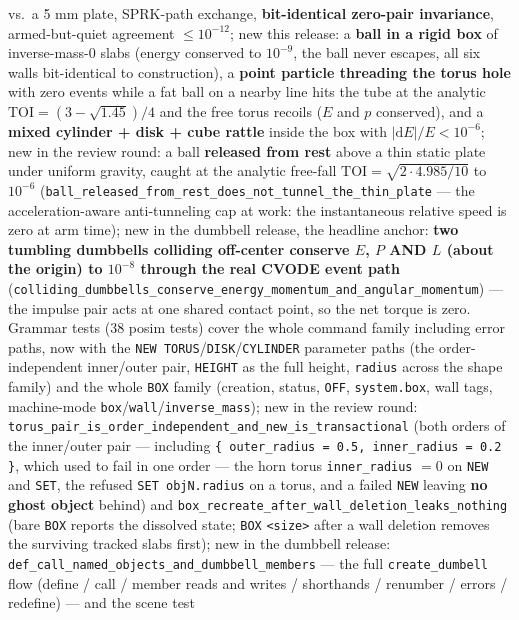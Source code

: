 \documentclass[11pt]{article}
\newcommand{\kw}[1]{\texttt{\uppercase{#1}}}
\newcommand{\code}[1]{\texttt{#1}}
\begin{document}
vs.\ a 5 mm plate, SPRK-path exchange, \textbf{bit-identical zero-pair
invariance}, armed-but-quiet agreement $\le 10^{-12}$; new this release: a
\textbf{ball in a rigid box} of inverse-mass-0 slabs (energy conserved to
$10^{-9}$, the ball never escapes, all six walls bit-identical to
construction), a \textbf{point particle threading the torus hole} with zero
events while a fat ball on a nearby line hits the tube at the analytic
$\mathrm{TOI} = (3 - \sqrt{1.45})/4$ and the free torus recoils ($E$ and $p$
conserved), and a \textbf{mixed cylinder + disk + cube rattle} inside the
box with $|\mathrm dE|/E < 10^{-6}$; new in the review round: a ball
\textbf{released from rest} above a thin static plate under uniform
gravity, caught at the analytic free-fall
$\mathrm{TOI} = \sqrt{2 \cdot 4.985/10}$ to $10^{-6}$
(\code{ball\_released\_from\_rest\_does\_not\_tunnel\_the\_thin\_plate}
--- the acceleration-aware anti-tunneling cap at work: the instantaneous
relative speed is zero at arm time); new in the dumbbell release, the
headline anchor: \textbf{two tumbling dumbbells colliding off-center
conserve $E$, $P$ AND $L$ (about the origin) to $10^{-8}$ through the real
CVODE event path}
(\code{colliding\_dumbbells\_conserve\_energy\_momentum\_and\_angular\_momentum})
--- the impulse pair acts at one shared contact point, so the net torque is
zero. Grammar tests (38 posim tests) cover
the whole command family including error paths, now with the
\kw{new torus}/\kw{disk}/\kw{cylinder} parameter paths (the
order-independent inner/outer pair, \kw{height} as the full height,
\code{radius} across the shape family) and the whole \kw{box} family
(creation, status, \kw{off}, \code{system.box}, wall tags, machine-mode
\code{box}/\code{wall}/\code{inverse\_mass}); new in the review round:
\code{torus\_pair\_is\_order\_independent\_and\_new\_is\_transactional}
(both orders of the inner/outer pair --- including
\code{\{ outer\_radius = 0.5, inner\_radius = 0.2 \}}, which used to fail
in one order --- the horn torus \code{inner\_radius} $= 0$ on \kw{new} and
\kw{set}, the refused \code{SET objN.radius} on a torus, and a failed
\kw{new} leaving \textbf{no ghost object} behind) and
\code{box\_recreate\_after\_wall\_deletion\_leaks\_nothing} (bare \kw{box}
reports the dissolved state; \kw{box} \code{<size>} after a wall deletion
removes the surviving tracked slabs first); new in the dumbbell release:
\code{def\_call\_named\_objects\_and\_dumbbell\_members} --- the full
\code{create\_dumbell} flow (define / call / member reads and writes /
shorthands / renumber / errors / redefine) --- and the scene test
\end{document}
